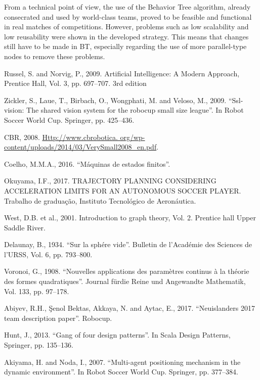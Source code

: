 \documentclass[conference]{IEEEtran}
\begin{document}
From a technical point of view, the use of the Behavior Tree algorithm, already consecrated and used by world-class teams, proved to be feasible and functional in real matches of competitions. However, problems such as low scalability and low reusability were shown in the developed strategy. This means that changes still have to be made in BT, especially regarding the use of more parallel-type nodes to remove these problems.

\begin{thebibliography}{00}
 Russel, S. and Norvig, P., 2009. Artificial Intelligence: A Modern Approach, Prentice Hall, Vol. 3, pp. 697–707. 3rd edition

 Zickler, S., Laue, T., Birbach, O., Wongphati, M. and Veloso, M., 2009. “Ssl-vision: The shared vision system for the
robocup small size league”. In Robot Soccer World Cup. Springer, pp. 425–436.

 CBR, 2008. \url{Http://www.cbrobotica. org/wp-content/uploads/2014/03/VerySmall2008_en.pdf}.

 Coelho, M.M.A., 2016. “Máquinas de estados finitos”.

 Okuyama, I.F., 2017. TRAJECTORY PLANNING CONSIDERING ACCELERATION LIMITS FOR AN AUTONOMOUS SOCCER PLAYER. Trabalho de graduação, Instituto Tecnológico de Aeronáutica.

 West, D.B. et al., 2001. Introduction to graph theory, Vol. 2. Prentice hall Upper Saddle River.

 Delaunay, B., 1934. “Sur la sphére vide”. Bulletin de l’Académie des Sciences de l’URSS, Vol. 6, pp. 793–800.

 Voronoi, G., 1908. “Nouvelles applications des paramètres continus à la théorie des formes quadratiques”. Journal fürdie Reine und Angewandte Mathematik, Vol. 133, pp. 97–178.

 Abiyev, R.H., Şenol Bektas, Akkaya, N. and Aytac, E., 2017. “Neuislanders 2017 team description paper”. Robocup.

 Hunt, J., 2013. “Gang of four design patterns”. In Scala Design Patterns, Springer, pp. 135–136.

 Akiyama, H. and Noda, I., 2007. “Multi-agent positioning mechanism in the dynamic environment”. In Robot Soccer World Cup. Springer, pp. 377–384.

\end{thebibliography}
\end{document}
